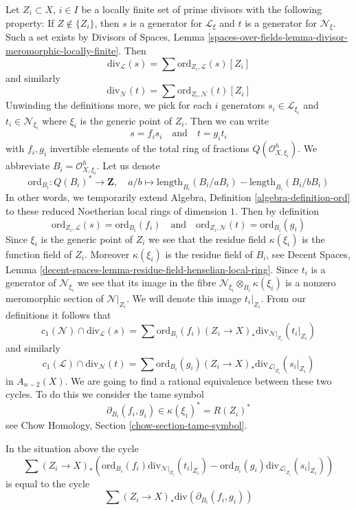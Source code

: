 \medskip\noindent
Let $Z_i \subset X$, $i \in I$ be a locally finite set of prime divisors
with the following property: If $Z \not \in \{Z_i\}$, then $s$ is a
generator for $\mathcal{L}_\xi$ and $t$ is a generator for $\mathcal{N}_\xi$.
Such a set exists by Divisors of Spaces, Lemma
\ref{spaces-over-fields-lemma-divisor-meromorphic-locally-finite}.
Then
$$
\text{div}_\mathcal{L}(s) = \sum \text{ord}_{Z_i, \mathcal{L}}(s) [Z_i]
$$
and similarly
$$
\text{div}_\mathcal{N}(t) = \sum \text{ord}_{Z_i, \mathcal{N}}(t) [Z_i]
$$
Unwinding the definitions more, we pick for each $i$ generators
$s_i \in \mathcal{L}_{\xi_i}$ and $t_i \in \mathcal{N}_{\xi_i}$
where $\xi_i$ is the generic point of $Z_i$. Then we can write
$$
s = f_i s_i
\quad\text{and}\quad
t = g_i t_i
$$
with $f_i, g_i$ invertible elements of the total ring of fractions
$Q(\mathcal{O}_{X, \xi_i}^h)$. We abbreviate $B_i = \mathcal{O}_{X, \xi_i}^h$.
Let us denote
$$
\text{ord}_{B_i} : Q(B_i)^* \longrightarrow \mathbf{Z},\quad
a/b \longmapsto
\text{length}_{B_i}(B_i/aB_i) - \text{length}_{B_i}(B_i/bB_i)
$$
In other words, we temporarily extend
Algebra, Definition \ref{algebra-definition-ord}
to these reduced Noetherian local rings of dimension $1$.
Then by definition
$$
\text{ord}_{Z_i, \mathcal{L}}(s) = \text{ord}_{B_i}(f_i)
\quad\text{and}\quad
\text{ord}_{Z_i, \mathcal{N}}(t) = \text{ord}_{B_i}(g_i)
$$
Since $\xi_i$ is the generic point of $Z_i$ we see that
the residue field $\kappa(\xi_i)$ is the function field of $Z_i$.
Moreover $\kappa(\xi_i)$ is the residue field of $B_i$, see
Decent Spaces, Lemma
\ref{decent-spaces-lemma-residue-field-henselian-local-ring}.
Since $t_i$ is a generator of $\mathcal{N}_{\xi_i}$ we see that
its image in the fibre $\mathcal{N}_{\xi_i} \otimes_{B_i} \kappa(\xi_i)$
is a nonzero meromorphic section of $\mathcal{N}|_{Z_i}$. We will denote
this image $t_i|_{Z_i}$. From our definitions it follows that
$$
c_1(\mathcal{N}) \cap \text{div}_\mathcal{L}(s) =
\sum \text{ord}_{B_i}(f_i)
(Z_i \to X)_*\text{div}_{\mathcal{N}|_{Z_i}}(t_i|_{Z_i})
$$
and similarly
$$
c_1(\mathcal{L}) \cap \text{div}_\mathcal{N}(t) =
\sum \text{ord}_{B_i}(g_i)
(Z_i \to X)_*\text{div}_{\mathcal{L}|_{Z_i}}(s_i|_{Z_i})
$$
in $A_{n - 2}(X)$. We are going to find a rational equivalence between
these two cycles. To do this we consider the tame symbol
$$
\partial_{B_i}(f_i, g_i) \in \kappa(\xi_i)^* = R(Z_i)^*
$$
see Chow Homology, Section \ref{chow-section-tame-symbol}.

\begin{lemma}
\label{lemma-key-formula}
In the situation above the cycle
$$
\sum
(Z_i \to X)_*\left(
\text{ord}_{B_i}(f_i) \text{div}_{\mathcal{N}|_{Z_i}}(t_i|_{Z_i}) -
\text{ord}_{B_i}(g_i) \text{div}_{\mathcal{L}|_{Z_i}}(s_i|_{Z_i}) \right)
$$
is equal to the cycle
$$
\sum (Z_i \to X)_*\text{div}(\partial_{B_i}(f_i, g_i))
$$
\end{lemma}

